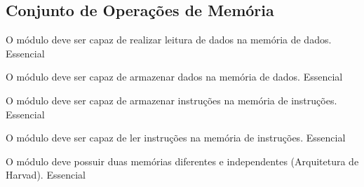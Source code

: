 \subsection{Conjunto de Operações de Memória}

	  \begin{functional}
		{O módulo deve ser capaz de realizar leitura de dados na memória de dados.}
		{Essencial}
		
        {O módulo deve ser capaz de armazenar dados na memória de dados.}
        {Essencial}

		{O módulo deve ser capaz de armazenar instruções na memória de instruções.}
		{Essencial}
		
		{O módulo deve ser capaz de ler instruções na memória de instruções.}
		{Essencial}
        
        {O módulo deve possuir duas memórias diferentes e independentes (Arquitetura de Harvad).}
        {Essencial}


		 
	 \end{functional}